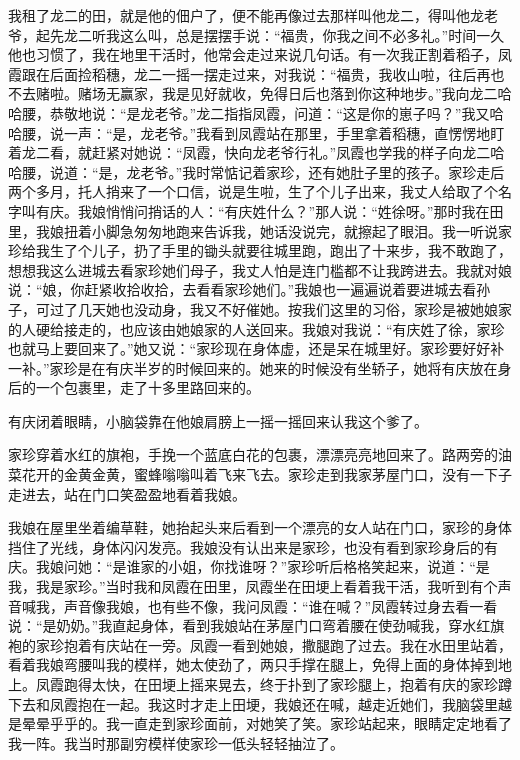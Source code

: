 \documentclass[12pt,UTF8]{ctexbook}
\begin{document}
我租了龙二的田，就是他的佃户了，便不能再像过去那样叫他龙二，得叫他龙老爷，起先龙二听我这么叫，总是摆摆手说：“福贵，你我之间不必多礼。”时间一久他也习惯了，我在地里干活时，他常会走过来说几句话。有一次我正割着稻子，凤霞跟在后面捡稻穗，龙二一摇一摆走过来，对我说：“福贵，我收山啦，往后再也不去赌啦。赌场无赢家，我是见好就收，免得日后也落到你这种地步。”我向龙二哈哈腰，恭敬地说：“是龙老爷。”龙二指指凤霞，问道：“这是你的崽子吗？”我又哈哈腰，说一声：“是，龙老爷。”我看到凤霞站在那里，手里拿着稻穗，直愣愣地盯着龙二看，就赶紧对她说：“凤霞，快向龙老爷行礼。”凤霞也学我的样子向龙二哈哈腰，说道：“是，龙老爷。”我时常惦记着家珍，还有她肚子里的孩子。家珍走后两个多月，托人捎来了一个口信，说是生啦，生了个儿子出来，我丈人给取了个名字叫有庆。我娘悄悄问捎话的人：“有庆姓什么？”那人说：“姓徐呀。”那时我在田里，我娘扭着小脚急匆匆地跑来告诉我，她话没说完，就擦起了眼泪。我一听说家珍给我生了个儿子，扔了手里的锄头就要往城里跑，跑出了十来步，我不敢跑了，想想我这么进城去看家珍她们母子，我丈人怕是连门槛都不让我跨进去。我就对娘说：“娘，你赶紧收拾收拾，去看看家珍她们。”我娘也一遍遍说着要进城去看孙子，可过了几天她也没动身，我又不好催她。按我们这里的习俗，家珍是被她娘家的人硬给接走的，也应该由她娘家的人送回来。我娘对我说：“有庆姓了徐，家珍也就马上要回来了。”她又说：“家珍现在身体虚，还是呆在城里好。家珍要好好补一补。”家珍是在有庆半岁的时候回来的。她来的时候没有坐轿子，她将有庆放在身后的一个包裹里，走了十多里路回来的。

有庆闭着眼睛，小脑袋靠在他娘肩膀上一摇一摇回来认我这个爹了。

家珍穿着水红的旗袍，手挽一个蓝底白花的包裹，漂漂亮亮地回来了。路两旁的油菜花开的金黄金黄，蜜蜂嗡嗡叫着飞来飞去。家珍走到我家茅屋门口，没有一下子走进去，站在门口笑盈盈地看着我娘。

我娘在屋里坐着编草鞋，她抬起头来后看到一个漂亮的女人站在门口，家珍的身体挡住了光线，身体闪闪发亮。我娘没有认出来是家珍，也没有看到家珍身后的有庆。我娘问她：“是谁家的小姐，你找谁呀？”家珍听后格格笑起来，说道：“是我，我是家珍。”当时我和凤霞在田里，凤霞坐在田埂上看着我干活，我听到有个声音喊我，声音像我娘，也有些不像，我问凤霞：“谁在喊？”凤霞转过身去看一看说：“是奶奶。”我直起身体，看到我娘站在茅屋门口弯着腰在使劲喊我，穿水红旗袍的家珍抱着有庆站在一旁。凤霞一看到她娘，撒腿跑了过去。我在水田里站着，看着我娘弯腰叫我的模样，她太使劲了，两只手撑在腿上，免得上面的身体掉到地上。凤霞跑得太快，在田埂上摇来晃去，终于扑到了家珍腿上，抱着有庆的家珍蹲下去和凤霞抱在一起。我这时才走上田埂，我娘还在喊，越走近她们，我脑袋里越是晕晕乎乎的。我一直走到家珍面前，对她笑了笑。家珍站起来，眼睛定定地看了我一阵。我当时那副穷模样使家珍一低头轻轻抽泣了。
\end{document}
